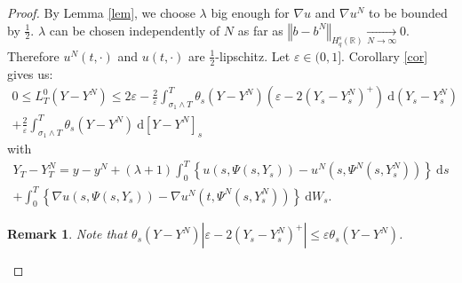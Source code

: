 \documentclass[11pt]{article}
\newtheorem{rem}{Remark}
\newcommand{\norme}[1]{\left\Vert #1\right\Vert}
\newcommand{\R}{\mathbb{R}}
\newcommand{\di}{\mathrm{d}}
\begin{document}
\begin{proof}
    By Lemma \ref{lem}, we choose $\lambda$ big enough for $\nabla u$ and $\nabla u^N$ to be bounded by $\frac{1}{2}$. $\lambda$ can be chosen independently of $N$ as far as $\norme{b - b^N}_{H_q^s(\R)} \underset{N\rightarrow\infty}{\longrightarrow} 0$. Therefore $u^N(t,\cdot)$ and $u(t,\cdot)$ are $\frac{1}{2}$-lipschitz. 
    Let $\varepsilon\in(0,1]$. Corollary \ref{cor} gives us:    
    \begin{multline*}
    0\leq L^0_T(Y-Y^N) \leq 2\varepsilon - \frac{2}{\varepsilon}\int_{\sigma_1\wedge T}^T \theta_s(Y-Y^N) \left(\varepsilon - 2{(Y_s-Y_s^N)^+}\right)\ \di \left(Y_s-Y_s^N\right)\\
    +\frac{2}{\varepsilon}\int_{\sigma_1\wedge T}^T \theta_s(Y-Y^N) \ \di\left[Y-Y^N\right]_s
    \end{multline*}    
    with
    \begin{multline*}    
    Y_T-Y_T^N = y-y^N + (\lambda + 1 )\int_0^T\left\{u\left(s,\Psi\left(s,Y_s\right)\right)-u^N\left(s,\Psi^N\left(s,Y_s^N\right)\right)\right\}\ \di s\\ + \int_0^T\left\{\nabla u\left(s,\Psi\left(s,Y_s\right)\right)-\nabla u^N\left(t,\Psi^N\left(s,Y_s^N\right)\right)\right\}\ \di W_s.
    \end{multline*}    
    \begin{rem}
        Note that $\theta_s(Y-Y^N) \left|\varepsilon - 2{(Y_s-Y_s^N)^+}\right|\leq \varepsilon\theta_s(Y-Y^N)$.
    \end{rem}


\end{proof}
\end{document}
